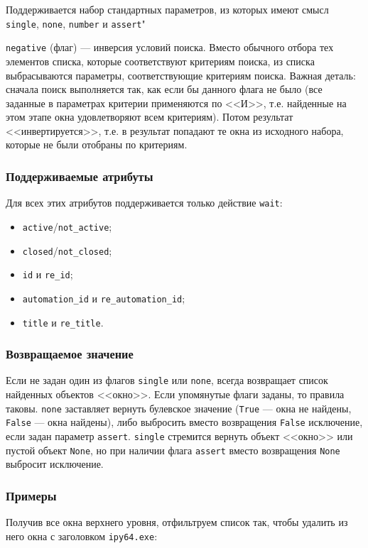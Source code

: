 \documentclass[11pt]{book} %
\begin{document}
Поддерживается набор стандартных параметров, из которых имеют смысл \verb"single", \verb|none|, \verb|number| и \verb"assert""


\verb"negative" (флаг) --- инверсия условий поиска. Вместо обычного отбора тех элементов списка, которые соответствуют критериям поиска, из списка выбрасываются параметры, соответствующие критериям поиска. Важная деталь: сначала поиск выполняется так, как если бы данного флага не было (все заданные в параметрах критерии применяются по <<И>>, т.е. найденные на этом этапе окна удовлетворяют всем критериям). Потом результат <<инвертируется>>, т.е. в результат попадают те окна из исходного набора, которые не были отобраны по критериям.


\subsubsection*{Поддерживаемые атрибуты} 

Для всех этих атрибутов поддерживается только действие \verb|wait|:

\begin{itemize}
	\item \verb"active"/\verb"not_active";
	\item \verb"closed"/\verb"not_closed";
	\item \verb"id" и \verb"re_id";
	\item \verb"automation_id" и \verb"re_automation_id";
	\item \verb"title" и \verb"re_title".
\end{itemize}



\subsubsection*{Возвращаемое значение}
Если не задан один из флагов \verb"single" или \verb"none", всегда возвращает список найденных объектов <<окно>>. Если упомянутые флаги заданы, то правила таковы. \verb"none" заставляет вернуть булевское значение (\verb"True" --- окна не найдены, \verb"False" --- окна найдены), либо выбросить вместо возвращения \verb"False" исключение, если задан параметр \verb"assert". \verb"single" стремится вернуть объект <<окно>> или пустой объект \verb"None", но при наличии флага \verb"assert" вместо возвращения \verb"None" выбросит исключение.



\subsubsection*{Примеры}
Получив все окна верхнего уровня, отфильтруем список так, чтобы удалить из него окна с заголовком \verb"ipy64.exe":
\end{document}

